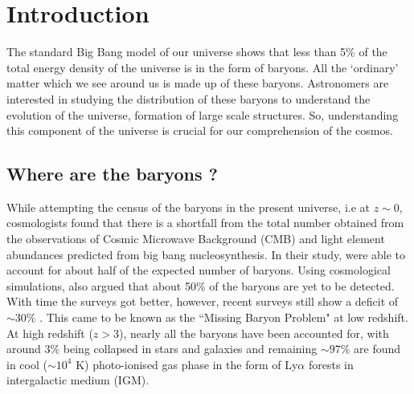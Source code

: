 \chapter{Introduction}  \label{chap:intro}

The standard Big Bang model of our universe shows that less than 5\% \citep{planck_collaboration_planck_2020} of the total energy density of the universe is in the form of baryons. All the `ordinary' matter which we see around us is made up of these baryons. Astronomers are interested in studying the distribution of these baryons to understand the evolution of the universe, formation of large scale structures. So, understanding this component of the universe is crucial for our comprehension of the cosmos.

\section{Where are the baryons ?}

While attempting the census of the baryons in the present universe, i.e at $z \sim 0$, cosmologists found that there is a shortfall from the total number obtained from the observations of Cosmic Microwave Background (CMB) and light element abundances predicted from big bang nucleosynthesis. In their study, \citet{Fukugita-1998} were able to account for about half of the expected number of baryons. Using cosmological simulations, \citet{cen-ostriker-1999} also argued that about 50\% of the baryons are yet to be detected. With time the surveys got better, however, recent surveys still show a deficit of $\sim 30$\% \citep{Shull}. This came to be known as the ``Missing Baryon Problem" at low redshift. At high redshift ($z>3$), nearly all the baryons have been accounted for, with around 3\% being collapsed in stars and galaxies and remaining $\sim97$\% are found in cool ($\sim10^4$ K) photo-ionised gas phase in the form of Ly$\alpha$ forests in intergalactic medium (IGM). 

